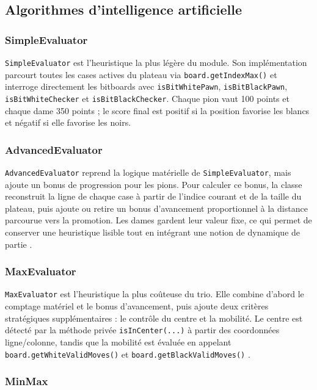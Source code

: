 \documentclass[a4paper]{article}
\begin{document}
\subsection{Algorithmes d'intelligence artificielle}

\subsubsection{SimpleEvaluator}

\texttt{SimpleEvaluator} est l'heuristique la plus légère du module. Son implémentation parcourt toutes les cases actives du plateau via \texttt{board.getIndexMax()} et interroge directement les bitboards avec \texttt{isBitWhitePawn}, \texttt{isBitBlackPawn}, \texttt{isBitWhiteChecker} et \texttt{isBitBlackChecker}. Chaque pion vaut 100 points et chaque dame 350 points ; le score final est positif si la position favorise les blancs et négatif si elle favorise les noirs\cite{windames_evaluation}.

\subsubsection{AdvancedEvaluator}

\texttt{AdvancedEvaluator} reprend la logique matérielle de \texttt{SimpleEvaluator}, mais ajoute un bonus de progression pour les pions. Pour calculer ce bonus, la classe reconstruit la ligne de chaque case à partir de l'indice courant et de la taille du plateau, puis ajoute ou retire un bonus d'avancement proportionnel à la distance parcourue vers la promotion. Les dames gardent leur valeur fixe, ce qui permet de conserver une heuristique lisible tout en intégrant une notion de dynamique de partie \cite{windames_evaluation}.

\subsubsection{MaxEvaluator}

\texttt{MaxEvaluator} est l'heuristique la plus coûteuse du trio. Elle combine d'abord le comptage matériel et le bonus d'avancement, puis ajoute deux critères stratégiques supplémentaires : le contrôle du centre et la mobilité. Le centre est détecté par la méthode privée \texttt{isInCenter(...)} à partir des coordonnées ligne/colonne, tandis que la mobilité est évaluée en appelant \texttt{board.getWhiteValidMoves()} et \texttt{board.getBlackValidMoves()} \cite{windames_evaluation}.

\subsubsection{MinMax}
\end{document}
